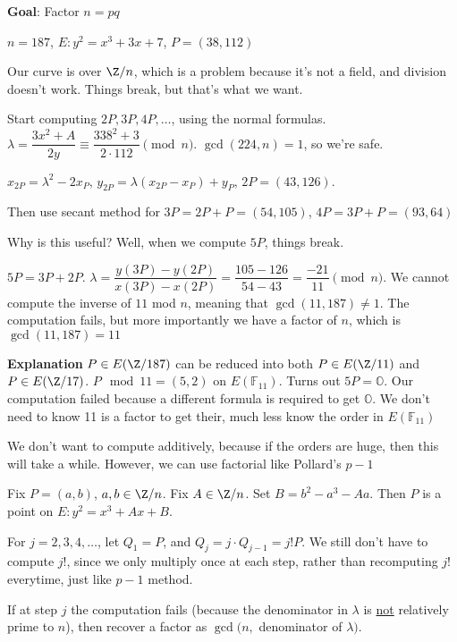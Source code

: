 \documentclass[10pt]{article}
\newcommand{\F}{\mathbb{F}}
\renewcommand{\O}{\mathbb{O}}
\begin{document}
\textbf{Goal}: Factor $n = pq$

\begin{exm*}
    $n = 187$, $E: y^2 = x^3 + 3x + 7$, $P = (38, 112)$
\end{exm*}
Our curve is over $\Z/n$, which is a problem because it's not a field, and division doesn't work. Things break, but that's what we want.

Start computing $2P, 3P, 4P, \ldots$, using the normal formulas. $\lambda = \dfrac{3x^2 + A}{2y} \equiv \dfrac{338^2 + 3}{2\cdot 112} \pmod{n}$. $\gcd(224, n) = 1$, so we're safe.

$x_{2P} = \lambda^2 - 2x_P$, $y_{2P} = \lambda(x_{2P}-x_P) + y_P$, $2P = (43, 126)$.

Then use secant method for $3P = 2P + P = (54, 105)$, $4P = 3P + P = (93, 64)$

Why is this useful? Well, when we compute $5P$, things break.

$5P = 3P + 2P$. $\lambda = \dfrac{y(3P) - y(2P)}{x(3P) - x(2P)} = \dfrac{105-126}{54-43} = \dfrac{-21}{11} \pmod{n}$. We cannot compute the inverse of $11$ mod $n$, meaning that $\gcd(11, 187) \neq 1$. The computation fails, but more importantly we have a factor of $n$, which is $\gcd(11, 187) = 11$

\textbf{Explanation} $P \in E(\Z/187)$ can be reduced into both $P \in E(\Z/11)$ and $P \in E(\Z/17)$. $P \mod{11} = (5, 2)$ on $E(\F_{11})$. Turns out $5P = \O$. Our computation failed because a different formula is required to get $\O$. We don't need to know 11 is a factor to get their, much less know the order in $E(\F_11)$

\begin{rmk}
    We don't want to compute additively, because if the orders are huge, then this will take a while. However, we can use factorial like Pollard's $p-1$
\end{rmk}

Fix $P = (a, b)$, $a, b \in \Z/n$. Fix $A \in \Z/n$. Set $B = b^2 - a^3 -Aa$. Then $P$ is a point on $E: y^2 = x^3 + Ax + B$.

For $j = 2, 3, 4, \ldots$, let $Q_1 = P$, and $Q_j = j\cdot Q_{j-1} = j!P$. We still don't have to compute $j!$, since we only multiply once at each step, rather than recomputing $j!$ everytime, just like $p-1$ method.

If at step $j$ the computation fails (because the denominator in $\lambda$ is \underline{not} relatively prime to $n$), then recover a factor as $\gcd(n,$ denominator of $\lambda)$. 
\end{document}
